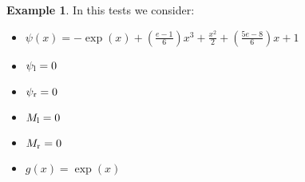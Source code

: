 \documentclass[11pt,a4paper]{article}
\theoremstyle{plain}
\theoremstyle{definition}
\newtheorem{exmp}[thm]{Example} %
\begin{document}
%
%
%
%
%

\begin{exmp}
\label{Example:PRO:bending:02_02_glob2}
In this tests we consider:
\begin{itemize}
\item $\psi(x)=-\exp(x)+\left(\frac{e-1}{6}\right)x^3+\frac{x^2}{2}+\left(\frac{5e-8}{6}\right)x+1$
\item $\psi_\text l=0$
\item $\psi_\text r=0$
\item $M_\text l=0$
\item $M_\text r=0$
\item $g(x)=\exp(x)$
\end{itemize}
\end{exmp}

%
%
%
%
\pagebreak

%
\end{document}

